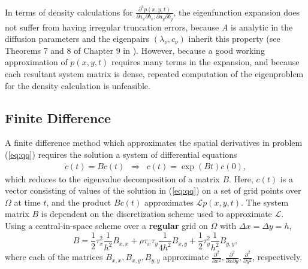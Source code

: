 \documentclass[10pt]{article}
\begin{document}
In terms of density calculations for
$\frac{\partial^4 p(x,y,t)}{\partial a_x \partial b_x, \partial
  a_y \partial b_y}$, the eigenfunction expansion does not suffer from
having irregular truncation errors, because $A$ is analytic in the
diffusion parameters and the eigenpairs $(\lambda_\nu, c_\nu)$ inherit
this property (see Theorems 7 and 8 of Chapter 9 in
\cite{lax2007linear-algebra}). However, because a good working
approximation of $p(x,y,t)$ requires many terms in the expansion, and
because each resultant system matrix is dense, repeated computation of
the eigenproblem for the density calculation is unfeasible.

\subsection{Finite Difference} \label{sec:finite-difference} A finite
difference method which approximates the spatial derivatives in
problem (\ref{eq:qq}) requires the solution a system of differential
equations
\begin{align}
  \dot{c}(t)= B c(t) &\Rightarrow& c(t) = \exp\left( Bt \right)c(0) \label{eq:eigenproblem-fd}, 
\end{align}
which reduces to the eigenvalue decomposition of a matrix $B$. Here,
$c(t)$ is a vector consisting of values of the solution in
(\ref{eq:qq}) on a set of grid points over $\Omega$ at time $t$, and
the product $Bc(t)$ approximates $\mathcal{L}p(x,y,t)$. The system
matrix $B$ is dependent on the discretization scheme used to
approximate $\mathcal{L}$. Using a central-in-space scheme over a
\textbf{regular} grid on $\Omega$ with $\Delta x = \Delta y = h$,
\[ B = \frac{1}{2}\tau_x^2 \frac{1}{h^2}B_{x,x} +
  \rho\tau_x\tau_y \frac{1}{4h^2}B_{x,y} + \frac{1}{2}\tau_y^2
  \frac{1}{h^2}B_{y,y},
\]
where each of the matrices $B_{x,x}, B_{x,y}, B_{y,y}$ approximate
$\frac{\partial^2}{\partial x^2}, \frac{\partial^2}{\partial
  x \partial y}, \frac{\partial^2}{\partial y^2}$, respectively.
\end{document}
